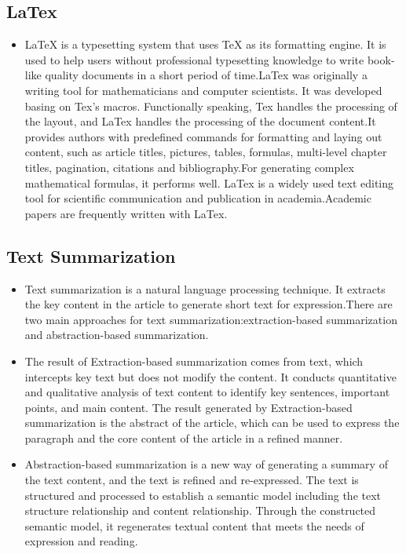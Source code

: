 \documentclass{l4proj}
\begin{document}
\subsection{LaTex}
\begin{itemize}
   \item
    LaTeX is a typesetting system that uses TeX as its formatting engine. It is used to help users without professional typesetting knowledge to write book-like quality documents in a short period of time.LaTex was originally a writing tool for mathematicians and computer scientists. It was developed basing on Tex's macros. Functionally speaking, Tex handles the processing of the layout, and LaTex handles the processing of the document content.It provides authors with predefined commands for formatting and laying out content, such as article titles, pictures, tables, formulas, multi-level chapter titles, pagination, citations and bibliography.For  generating complex mathematical formulas, it performs well.
     LaTex is a widely used text editing tool for scientific communication and publication in academia.Academic papers are frequently written with LaTex.
    \citep{InternetArchiveBot_2022}

\end{itemize}

\subsection{Text Summarization}
\begin{itemize}
    \item
    Text summarization is a natural language processing technique. It extracts the key content in the article to generate short text for expression.There are two main approaches for text summarization:extraction-based summarization and abstraction-based summarization.
    \item
    The result of Extraction-based summarization comes from text, which intercepts key text but does not modify the content. It conducts quantitative and qualitative analysis of text content to identify key sentences, important points, and main content. The result generated by Extraction-based summarization is the abstract of the article, which can be used to express the paragraph and the core content of the article in a refined manner.
    \item
    Abstraction-based summarization is a new way of generating a summary of the text content, and the text is refined and re-expressed. The text is structured and processed to establish a semantic model including the text structure relationship and content relationship. Through the constructed semantic model, it regenerates textual content that meets the needs of expression and reading.
\end{itemize}
\end{document}
